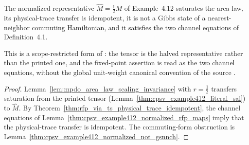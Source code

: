 \begin{lemma}
    \label{thm:cpsv_example412_normalized_four_properties}
    \leanok
    The normalized representative
    $\widehat M=\frac12 M$ of Example~4.12 saturates the area law, its
    physical-trace transfer is idempotent, it is not a Gibbs state of a
    nearest-neighbor commuting Hamiltonian, and it satisfies the two channel
    equations of Definition~4.1.

    This is a scope-restricted form of
    \cite[Example~4.12]{Cirac2016MPDO_arXiv}: the tensor is the halved
    representative rather than the printed one, and the fixed-point assertion
    is read as the two channel equations, without the global unit-weight
    canonical convention of the source
    \cite{gap:cpsv16_example_4_12_normalization,
        gap:cpsv16_unit_weight_rfp_scale_tension}.
\end{lemma}
\begin{proof}\leanok
    Lemma~\ref{lem:mpdo_area_law_scaling_invariance} with $r=\frac12$
    transfers saturation from the printed tensor
    (Lemma~\ref{thm:cpsv_example412_literal_sal}) to $\widehat M$. By
    Theorem~\ref{thm:rfp_via_ts_physical_trace_idempotent}, the channel
    equations of Lemma~\ref{thm:cpsv_example412_normalized_rfp_maps} imply
    that the physical-trace transfer is idempotent. The commuting-form
    obstruction is
    Lemma~\ref{thm:cpsv_example412_normalized_not_gsnnch}.
\end{proof}

